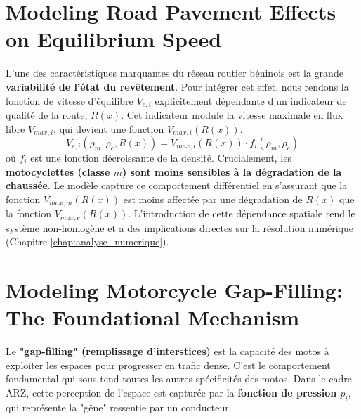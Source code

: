 \section{Modeling Road Pavement Effects on Equilibrium Speed}
\label{sec:modeling_pavement}

L'une des caractéristiques marquantes du réseau routier béninois est la grande \textbf{variabilité de l'état du revêtement}. Pour intégrer cet effet, nous rendons la fonction de vitesse d'équilibre \( V_{e,i} \) explicitement dépendante d'un indicateur de qualité de la route, \( R(x) \). Cet indicateur module la vitesse maximale en flux libre \( V_{max,i} \), qui devient une fonction \( V_{max,i}(R(x)) \).
\begin{equation}
    \label{eq:Ve_depends_on_R}
    V_{e,i}(\rho_m, \rho_c, R(x)) = V_{max,i}(R(x)) \cdot f_i(\rho_m, \rho_c)
\end{equation}
où \( f_i \) est une fonction décroissante de la densité. Crucialement, les \textbf{motocyclettes (classe \( m \)) sont moins sensibles à la dégradation de la chaussée}. Le modèle capture ce comportement différentiel en s'assurant que la fonction \( V_{max,m}(R(x)) \) est moins affectée par une dégradation de \( R(x) \) que la fonction \( V_{max,c}(R(x)) \). L'introduction de cette dépendance spatiale rend le système non-homogène et a des implications directes sur la résolution numérique (Chapitre \ref{chap:analyse_numerique}).

\section{Modeling Motorcycle Gap-Filling: The Foundational Mechanism}
\label{sec:modeling_gap_filling}

Le \textbf{"gap-filling" (remplissage d'interstices)} est la capacité des motos à exploiter les espaces pour progresser en trafic dense. C'est le comportement fondamental qui sous-tend toutes les autres spécificités des motos. Dans le cadre ARZ, cette perception de l'espace est capturée par la \textbf{fonction de pression \( p_i \)}, qui représente la "gêne" ressentie par un conducteur.

